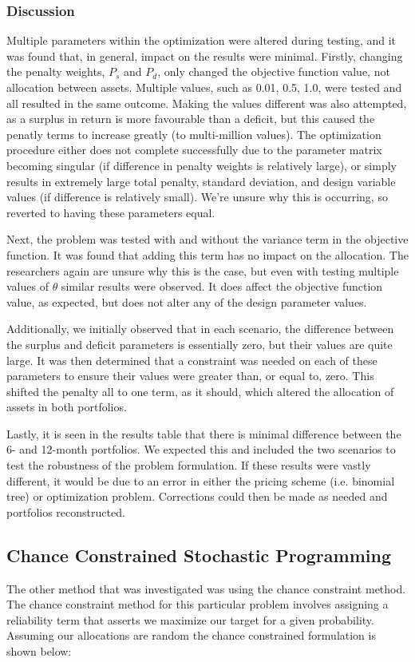 \documentclass[12pt]{article}
\begin{document}
\subsubsection{Discussion}

Multiple parameters within the optimization were altered during testing, and it was found that, in general, impact on the results were minimal. Firstly, changing the penalty weights, $P_s$ and $P_d$, only changed the objective function value, not allocation between assets. Multiple values, such as 0.01, 0.5, 1.0, were tested and all resulted in the same outcome. Making the values different was also attempted, as a surplus in return is more favourable than a deficit, but this caused the penatly terms to increase greatly (to multi-million values). The optimization procedure either does not complete successfully due to the parameter matrix becoming singular (if difference in penalty weights is relatively large), or simply results in extremely large total penalty, standard deviation, and design variable values (if difference is relatively small). We’re unsure why this is occurring, so reverted to having these parameters equal.

Next, the problem was tested with and without the variance term in the objective function. It was found that adding this term has no impact on the allocation. The researchers again are unsure why this is the case, but even with testing multiple values of $\theta$ similar results were observed. It does affect the objective function value, as expected, but does not alter any of the design parameter values.
	
Additionally, we initially observed that in each scenario, the difference between the surplus and deficit parameters is essentially zero, but their values are quite large. It was then determined that a constraint was needed on each of these parameters to ensure their values were greater than, or equal to, zero. This shifted the penalty all to one term, as it should, which altered the allocation of assets in both portfolios.
	
Lastly, it is seen in the results table that there is minimal difference between the 6- and 12-month portfolios. We expected this and included the two scenarios to test the robustness of the problem formulation. If these results were vastly different, it would be due to an error in either the pricing scheme (i.e. binomial tree) or optimization problem. Corrections could then be made as needed and portfolios reconstructed.

\subsection{Chance Constrained Stochastic Programming}
The other method that was investigated was using the chance constraint method. The chance constraint method for this particular problem involves assigning a reliability term that asserts we maximize our target for a given probability. Assuming our allocations are random the chance constrained formulation is shown below:
\end{document}
